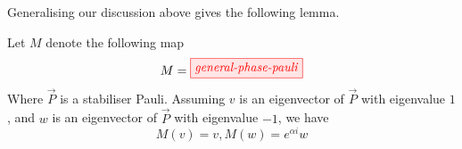 Generalising our discussion above gives the following lemma.

\begin{lemma}\label{lm:general-phase-pauli}
	Let $M$ denote the following map 
	$$
	M = \tikzfig{general-phase-pauli}
	$$
	Where $\vec{P}$ is a stabiliser Pauli. 
	Assuming $v$ is an eigenvector of $\vec{P}$ with eigenvalue $1$, and $w$ is an eigenvector of $\vec{P}$ with eigenvalue $-1$, we have
$$
M(v) = v, M(w) = e^{\alpha i} w
$$
\end{lemma}


